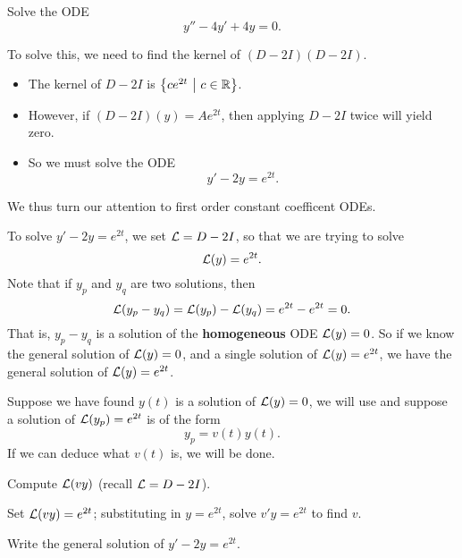 
\begin{applicationActivities}

\begin{activity}{10}
Solve the ODE \[ y''-4y'+4y=0.\]
\end{activity}

\begin{observation}
To solve this, we need to find the kernel of \( (D-2I)(D-2I) \).
\begin{itemize}
\item The kernel of \(D-2I\) is \(\left\{ ce^{2t}\ \middle|\ c \in \mathbb{R} \right\}\).
\item However, if \( (D-2I)(y) = Ae^{2t} \), then applying \(D-2I\) twice will yield zero.
\item So we must solve the ODE \[y'-2y=e^{2t}.\]
\end{itemize}

\vfill
We thus turn our attention to  first order constant coefficent ODEs.
\end{observation}


\begin{observation}
To solve \(y'-2y=e^{2t}\), we set \(\mathcal{L}=D-2I\), so that we are trying to solve \[\mathcal{L}(y)=e^{2t}.\]  
\vfill
Note that if \(y_p\) and \(y_q\) are two solutions, then \[\mathcal{L}(y_p-y_q)=\mathcal{L}(y_p)-\mathcal{L}(y_q)=e^{2t}-e^{2t}=0.\]
\vfill
That is, \(y_p-y_q\) is a solution of the \textbf{homogeneous} ODE \(\mathcal{L}(y)=0\).
\vfill
So if we know the general solution of \(\mathcal{L}(y)=0\), and a single solution of \(\mathcal{L}(y)=e^{2t}\), we have the general solution of \(\mathcal{L}(y)=e^{2t}\).
\end{observation}

\begin{activity}{15}
Suppose we have found  \(y(t)\) is a solution of \(\mathcal{L}(y)=0\), we will use  and suppose a solution of \(\mathcal{L}(y_p)=e^{2t}\) is of the form \[y_p =v(t) y(t).\]  
\vfill
If we can deduce what \(v(t)\) is, we will be done.
\vfill
\begin{subactivity}
Compute \(\mathcal{L}(vy)\) (recall \(\mathcal{L}=D-2I\)).
\end{subactivity}
\begin{subactivity}
Set \(\mathcal{L}(vy)=e^{2t}\); substituting in \(y=e^{2t}\), solve \(v'y=e^{2t}\) to find \(v\).  
\end{subactivity}
\begin{subactivity}
Write the general solution of \(y'-2y=e^{2t}\).
\end{subactivity}
\end{activity}


\end{applicationActivities}
